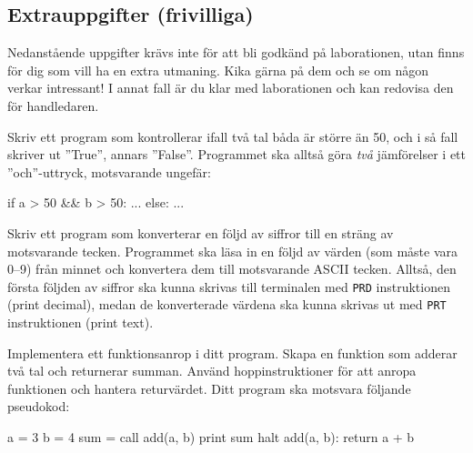 \subsection{Extrauppgifter (frivilliga)}

Nedanstående uppgifter krävs inte för att bli godkänd på laborationen, utan finns för dig som vill ha en extra utmaning. Kika gärna på dem och se om någon verkar intressant! I annat fall är du klar med laborationen och kan redovisa den för handledaren.

\begin{Extrauppgifter}
\item {}Skriv ett program som kontrollerar ifall två tal båda är större än 50, och i så fall skriver ut ''True'', annars ''False''. Programmet ska alltså göra \emph{två} jämförelser i ett ''och''-uttryck, motsvarande ungefär:

\begin{Code}[language=]
if a > 50 && b > 50:
  ...
else:
  ...
\end{Code}

\vspace{-3mm}


\item {} Skriv ett program som konverterar en följd av siffror till en sträng av motsvarande tecken. Programmet ska läsa in en följd av värden (som måste vara 0--9) från minnet och konvertera dem till motsvarande ASCII tecken. Alltså, den första följden av siffror ska kunna skrivas till terminalen med \texttt{PRD} instruktionen (print decimal), medan de konverterade värdena ska kunna skrivas ut med \texttt{PRT} instruktionen (print text).


\item {} Implementera ett funktionsanrop i ditt program. Skapa en funktion som adderar två tal och returnerar summan. Använd hoppinstruktioner för att anropa funktionen och hantera returvärdet. Ditt program ska motsvara följande pseudokod:

\begin{Code}[language=]
a = 3
b = 4
sum = call add(a, b)
print sum
halt
add(a, b):
  return a + b
\end{Code}


\end{Extrauppgifter}
